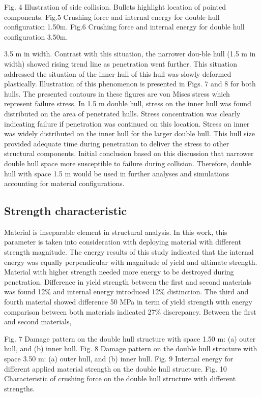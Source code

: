 \documentclass[10pt,journal]{IEEEtran}
\begin{document}
Fig. 4 Illustration of side collision. Bullets highlight location of pointed components. 
Fig.5 Crushing force and internal energy for double hull configuration 1.50m.
Fig.6 Crushing force and internal energy for double hull configuration 3.50m.
 
3.5 m in width. Contrast with this situation, the narrower dou-ble hull (1.5 m in width) showed rising trend line as penetration went further. 
This situation addressed the situation of the inner hull of this hull was slowly deformed plastically. Illustration of this phenomenon is presented in Figs. 7 and 8 for both hulls. 
The presented contours in these figures are von Mises stress which represent failure stress. In 1.5 m double hull, stress on the inner hull was found distributed on the area of penetrated hulls. 
Stress concentration was clearly indicating failure if pen­etration was continued on this location. 
Stress on inner was widely distributed on the inner hull for the larger double hull. This hull size provided adequate time during penetration to deliver the stress to other structural components. 
Initial conclusion based on this discussion that narrower double hull space more susceptible to failure during collision. 
Therefore, double hull with space 1.5 m would be used in further analyses and simulations accounting for material configurations. 

\subsection{Strength characteristic}

Material is inseparable element in structural analysis. In this work, this parameter is taken into consideration with deploying material with different strength magnitude. 
The energy results of this study indicated that the internal energy was equally perpendicular with magnitude of yield and ultimate strength. 
Material with higher strength needed more energy to be destroyed during penetration. Difference in yield strength between the first and second materials was found 12\% and internal energy introduced 12\% distinction. 
The third and fourth material showed difference 50 MPa in term of yield strength with energy comparison between both materials indicated 27\% discrepancy. Between the first and second materials, 

Fig. 7 Damage pattern on the double hull structure with space 1.50 m: (a) outer hull, and (b) inner hull. 
Fig. 8 Damage pattern on the double hull structure with space 3.50 m: (a) outer hull, and (b) inner hull. 
Fig. 9 Internal energy for different applied material strength on the double hull structure. 
Fig. 10 Characteristic of crushing force on the double hull structure with different strengths.
\end{document}
